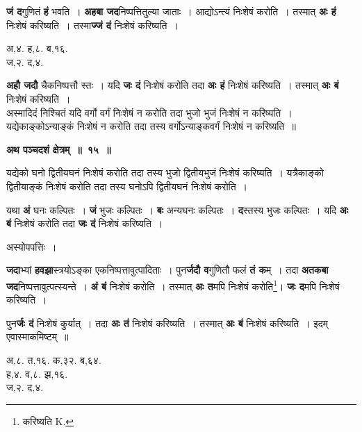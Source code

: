 \documentclass[11pt, openany]{book}
\begin{document}
\begin{flushleft}
\begin{minipage}[t]{0.6\textwidth}
\hspace{4mm} \textbf{जं द}गुणितं \textbf{हं} भवति~। \textbf{अहबा जद}निष्पत्तितुल्या जाताः~। आद्योऽन्त्यं  निःशेषं करोति~। तस्मात् \textbf{अः हं} निःशेषं करिष्यति~। तस्मा\textbf{ज्जं दं} निःशेषं करिष्यति~।
\end{minipage} 
\hfill
\begin{minipage}[t]{0.3\textwidth}
अ,४. ह,८. ब,१६.\\
ज,२. द,४. 
\end{minipage}
\end{flushleft}

\textbf{अहौ जदौ} चैकनिष्पत्तौ स्तः~। यदि \textbf{जः दं} निःशेषं करोति तदा \textbf{अः हं} निःशेषं करिष्यति~। तस्मात् \textbf{अः बं} निःशेषं करिष्यति~। \\

 अस्मादिदं निश्चितं यदि वर्गो वर्गं निःशेषं न करोति तदा भुजो भुजं निःशेषं न करिष्यति~। यद्येकाङ्कोऽन्याङ्कं निःशेषं न करोति तदा तस्य वर्गोऽन्याङ्कवर्गं निःशेषं न करिष्यति~॥ 
\vspace{2mm}

\begin{center}
\textbf{\large अथ पञ्चदशं क्षेत्रम्~॥~१५~॥}
\end{center}

 {\ab यद्येको घनो द्वितीयघनं निःशेषं करोति तदा तस्य भुजो द्वितीयभुजं निःशेषं करिष्यति~। यत्रैकाङ्को द्वितीयाङ्कं निःशेषं करोति तदा तस्य घनोऽपि द्वितीयघनं निःशेषं करोति~। }

\newpage
 यथा \textbf{अं} घनः कल्पितः~। \textbf{जं} भुजः कल्पितः~। \textbf{बः} अन्यघनः कल्पितः~। \textbf{द}स्तस्य भुजः कल्पितः~। यदि \textbf{अः बं} निःशेषं करोति तदा \textbf{जः दं} निःशेषं करिष्यति~। 

\begin{center}
अस्योपपत्तिः~।
\end{center}

 \textbf{जदा}भ्यां \textbf{हवझा}स्त्रयोऽङ्का एकनिष्पत्तावुत्पादिताः~। पुन\textbf{र्जदौ व}गुणितौ फलं \textbf{तं क}म्~। तदा \textbf{अतकबा जद}निष्पत्तावुत्पत्स्यन्ते~। \textbf{अं बं} निःशेषं करोति~। तस्मात् \textbf{अः त}मपि निःशेषं करोति\renewcommand{\thefootnote}{१}\footnote{करिष्यति {\en K.}}\;। \textbf{जः द}मपि निःशेषं करिष्यति~। 

\begin{flushleft}
\begin{minipage}[t]{0.6\textwidth}
\hspace{4mm} पुन\textbf{र्जः दं} निःशेषं कुर्यात्~। तदा \textbf{अः तं} निःशेषं करिष्यति~। तस्मात् \textbf{अः बं} निःशेषं करिष्यति~। इदम् एवास्माकमिष्टम्~॥ 
\end{minipage} 
\hfill
\begin{minipage}[t]{0.3\textwidth}
अ,८. त,१६. क,३२. ब,६४.\\
ह,४. व,८. झ,१६.\\
ज,२. द,४.
\end{minipage}
\end{flushleft}
\end{document}
